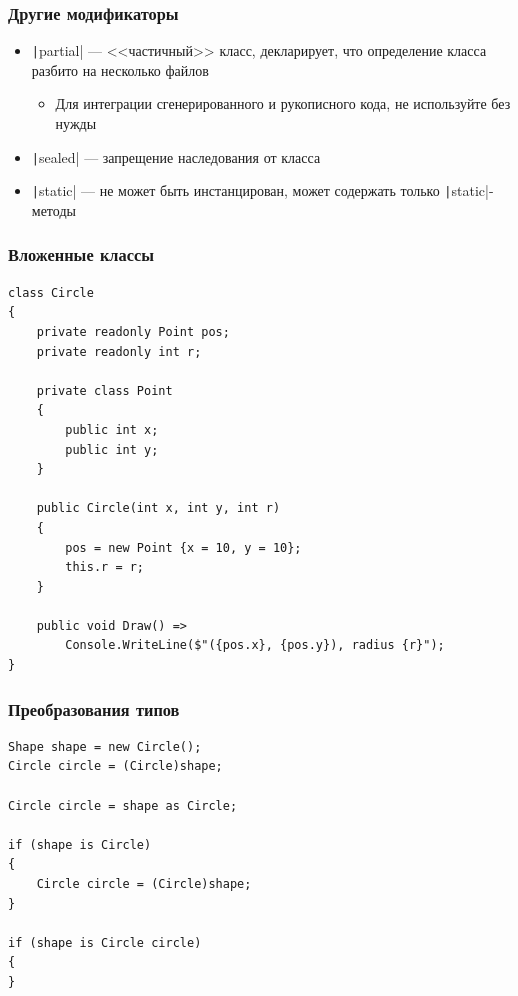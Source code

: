 \documentclass[xetex,mathserif,serif]{beamer}
\begin{document}
	\begin{frame}
		\frametitle{Другие модификаторы}
		\begin{itemize}
			\item \texttt|partial| --- <<частичный>> класс, декларирует, что определение класса разбито на несколько файлов
			\begin{itemize}
				\item Для интеграции сгенерированного и рукописного кода, не используйте без нужды
			\end{itemize}
			\item \texttt|sealed| --- запрещение наследования от класса
			\item \texttt|static| --- не может быть инстанцирован, может содержать только \texttt|static|-методы
		\end{itemize}
	\end{frame}

	\begin{frame}[fragile]
		\frametitle{Вложенные классы}
		\begin{scriptsize}
			\begin{verbatim}
class Circle
{
    private readonly Point pos;
    private readonly int r;

    private class Point
    {
        public int x;
        public int y;
    }

    public Circle(int x, int y, int r)
    {
        pos = new Point {x = 10, y = 10};
        this.r = r;
    }

    public void Draw() =>
        Console.WriteLine($"({pos.x}, {pos.y}), radius {r}");
}
			\end{verbatim}
		\end{scriptsize}
	\end{frame}

	\begin{frame}[fragile]
		\frametitle{Преобразования типов}
		\begin{verbatim}
Shape shape = new Circle();
Circle circle = (Circle)shape;

Circle circle = shape as Circle;

if (shape is Circle)
{
    Circle circle = (Circle)shape;
}

if (shape is Circle circle)
{
}
		\end{verbatim}
	\end{frame}
\end{document}
